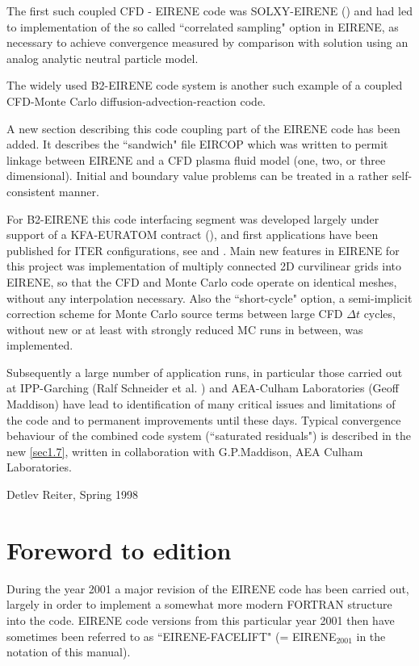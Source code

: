 The first such coupled \acs{CFD} - EIRENE code was SOLXY-EIRENE
(\cite{kn:Gerhauser88a}) and had led to implementation of the so called
``correlated sampling" option in EIRENE, as necessary to achieve convergence
measured by comparison with solution using an analog analytic neutral particle
model.

The widely used B2-EIRENE code system \cite{kn:Reiter91b} is another such
example of a coupled \acs{CFD}-Monte Carlo diffusion-advection-reaction code.

A new section describing this code coupling part of the EIRENE code has been
added.
It describes the ``sandwich" file EIRCOP which was written to permit linkage
between EIRENE and a \ac{CFD} plasma fluid model (one, two, or three
dimensional).
Initial and boundary value problems can be treated in a rather self-consistent
manner.

For B2-EIRENE this code interfacing segment was developed largely under support
of a KFA-EURATOM contract (\cite{kn:Net}), and first applications have been
published for ITER configurations, see \cite{kn:Reiter91b} and
\cite{kn:Maddison91}.
Main new features in EIRENE for this project was implementation of multiply
connected 2D curvilinear grids into EIRENE, so that the \ac{CFD} and Monte
Carlo code operate on identical meshes, without any interpolation necessary.
Also the ``short-cycle" option, a semi-implicit correction scheme for Monte
Carlo source terms between large \ac{CFD} $\Delta t$ cycles, without new or at
least with strongly reduced MC runs in between, was implemented.

Subsequently a large number of application runs, in particular those carried
out at IPP-Garching (Ralf Schneider et al.
) and AEA-Culham Laboratories
(Geoff Maddison) have lead to identification of many critical issues
and limitations of the code and to permanent improvements
until these days.
Typical convergence behaviour of the combined code system (``saturated
residuals") is described in the new \cref{sec1.7}, written in collaboration
with G.P.Maddison, AEA Culham Laboratories.

Detlev Reiter, Spring	      1998 

\section*{Foreword to  edition} \label{forew3} \bigskip During
the year 2001 a major revision of the EIRENE code has been carried out, largely
in order to implement a somewhat more modern FORTRAN structure into the code.
EIRENE code versions from this particular year 2001 then have sometimes been
referred to as ``EIRENE-FACELIFT"  (= EIRENE$_{2001}$ in the notation of this
manual).

